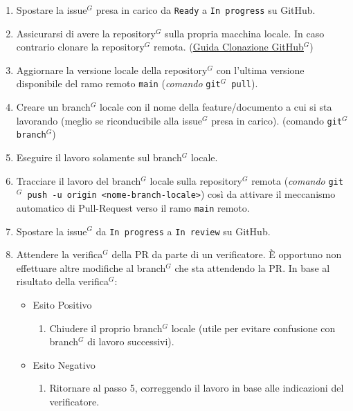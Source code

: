 \documentclass[a4paper,10pt]{article}
\begin{document}
\begin{enumerate}
  \item Spostare la issue$^G$ presa in carico da \texttt{Ready} a \texttt{In progress} su GitHub.
  \item Assicurarsi di avere la repository$^G$ sulla propria macchina locale. In caso contrario clonare la repository$^G$ remota. 
  (\href{https://docs.github.com/en/repositories/creating-and-managing-repositories/cloning-a-repository}{\underline{Guida Clonazione GitHub$^G$}})  
  \item Aggiornare la versione locale della repository$^G$ con l'ultima versione disponibile del ramo remoto \texttt{main} (\textit{comando} \texttt{git$^G$ pull}).
  \item Creare un branch$^G$ locale con il nome della feature/documento a cui si sta lavorando (meglio se riconducibile alla issue$^G$ presa in carico). 
    (comando \texttt{git$^G$ branch$^G$})
  \item Eseguire il lavoro solamente sul branch$^G$ locale. 
  \item Tracciare il lavoro del branch$^G$ locale sulla repository$^G$ remota (\textit{comando} \texttt{git$^G$ push -u origin <nome-branch-locale>}) così da attivare il meccanismo
    automatico di Pull-Request verso il ramo \texttt{main} remoto.
  \item Spostare la issue$^G$ da \texttt{In progress} a \texttt{In review} su GitHub. 
  \item Attendere la verifica$^G$ della PR da parte di un verificatore. È opportuno non effettuare altre modifiche al branch$^G$ che sta attendendo la PR.
    In base al risultato della verifica$^G$:
    \begin{itemize}
      \item Esito Positivo
        \begin{enumerate}
          \item Chiudere il proprio branch$^G$ locale (utile per evitare confusione con branch$^G$ di lavoro successivi).
        \end{enumerate}
      \item Esito Negativo
        \begin{enumerate}
          \item Ritornare al passo 5, correggendo il lavoro in base alle indicazioni del verificatore.
        \end{enumerate}
    \end{itemize}
\end{enumerate}
\end{document}
